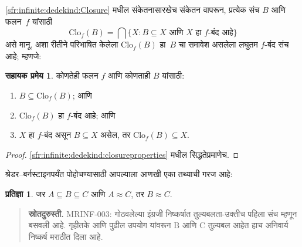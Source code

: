 \documentclass[11pt,a4paper,openany]{book}
\theoremstyle{definition}
\newtheorem{prop}[defn]{प्रतिज्ञा}
\newcommand{\Setabs}[2]{\{#1:#2\}}
\newcommand{\cardeq}[2]{#1 \approx #2}
\newcommand{\Closureofunder}[2]{\mathrm{Clo}_{#1}(#2)}
\newtheorem{lem}[defn]{सहायक प्रमेय}
\begin{document}
\ref{sfr:infinite:dedekind:Closure} मधील संकेतनासारखेच संकेतन
वापरून, प्रत्येक संच $B$ आणि फलन~$f$ यांसाठी
\[
\Closureofunder{f}{B} = \bigcap \Setabs{X}{B \subseteq X
\text{ आणि $X$ हा $f$-बंद आहे}}
\]
असे मानू. अशा रीतीने परिभाषित केलेला $\Closureofunder{f}{B}$ हा~$B$
चा समावेश असलेला लघुतम $f$-बंद संच आहे; म्हणजे:

\begin{lem}\label{sfr:infinite:card-sb:Closureprops}
	कोणतेही फलन $f$ आणि कोणताही $B$ यांसाठी:
	\begin{enumerate}
		\item\label{sfr:infinite:card-sb:Closurehaselem} $B \subseteq \Closureofunder{f}{B}$; आणि
		\item\label{sfr:infinite:card-sb:Closureclosed} $\Closureofunder{f}{B}$ हा $f$-बंद आहे; आणि
		\item\label{sfr:infinite:card-sb:Closuresmallest} $X$ हा $f$-बंद असून $B
		\subseteq X$ असेल, तर $\Closureofunder{f}{B} \subseteq X$.
	\end{enumerate}
\end{lem}

\begin{proof}
\ref{sfr:infinite:dedekind:closureproperties} मधील सिद्धतेप्रमाणेच.
\end{proof}

श्रेडर--बर्नस्टाइनपर्यंत पोहोचण्यासाठी आपल्याला आणखी एका तथ्याची गरज आहे:

\begin{prop}\label{sfr:infinite:card-sb:sbhelper}
जर $A \subseteq B \subseteq C$ आणि $A \approx C$, तर $\cardeq{B}{C}$.
\end{prop}
\begin{quote}\small\textbf{स्रोतदुरुस्ती.} MRINF-003: गोठवलेल्या इंग्रजी निष्कर्षात तुल्यबलता-उक्तीच पहिला संच म्हणून बसवली आहे. गृहीतके आणि पुढील उपयोग यांवरून B आणि C तुल्यबल आहेत हाच अनिवार्य निष्कर्ष मराठीत दिला आहे.\end{quote}
\end{document}

